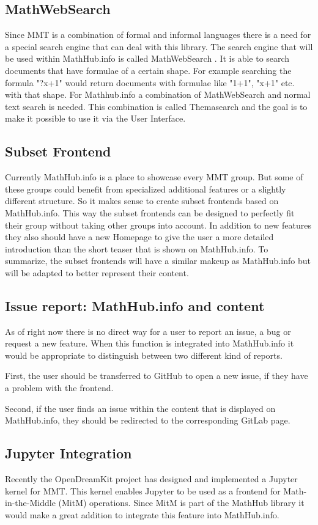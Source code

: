 \documentclass[11pt,a4paper]{article}
\begin{document}
\subsection{MathWebSearch}
Since MMT is a combination of formal and informal languages there is a need for a special search engine that can deal with this library.
The search engine that will be used within MathHub.info is called MathWebSearch \cite{HamKoh:fsfm15}.
It is able to search documents that have formulae of a certain shape.
For example searching the formula "?x+1" would return documents with formulae like "1+1", "x+1" etc. with that shape.
For Mathhub.info a combination of MathWebSearch and normal text search is needed.
This combination is called Themasearch and the goal is to make it possible to use it via the User Interface.

\subsection{Subset Frontend}
Currently MathHub.info is a place to showcase every MMT group.
But some of these groups could benefit from specialized additional features or a slightly different structure.
So it makes sense to create subset frontends based on MathHub.info.
This way the subset frontends can be designed to perfectly fit their group without taking other groups into account.
In addition to new features they also should have a new Homepage to give the user a more detailed introduction than the short teaser that is shown on MathHub.info.
To summarize, the subset frontends will have a similar makeup as MathHub.info but will be adapted to better represent their content.

\subsection{Issue report: MathHub.info and content}
As of right now there is no direct way for a user to report an issue, a bug or request a new feature.
When this function is integrated into MathHub.info it would be appropriate to distinguish between two different kind of reports.

First, the user should be transferred to GitHub to open a new issue, if they have a problem with the frontend.

Second, if the user finds an issue within the content that is displayed on MathHub.info, they should be redirected to the corresponding GitLab page. 
\subsection{Jupyter Integration}
Recently the OpenDreamKit project has designed and implemented a Jupyter kernel \cite{notebook} for MMT. 
This kernel enables Jupyter to be used as a frontend for Math-in-the-Middle (MitM) operations.
Since MitM is part of the MathHub library it would make a great addition to integrate this feature into MathHub.info.
\newpage
\printbibliography
\end{document}
